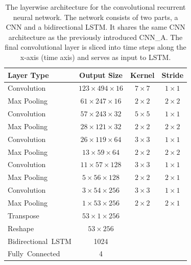     
  \begin{table}[]
  \centering
  \begin{tabularx}{\textwidth}{Xccc}
  \toprule
Layer Type                                          & Output Size    & Kernel & Stride  \\ \midrule
Convolution               & $123\times494\times16$  & $7\times7$    & $1\times1$    \\ 
Max Pooling               & $61\times247\times16$   & $2\times2$    & $2\times2$    \\ 
Convolution               & $57\times243\times32$   & $5\times5$    & $1\times1$    \\ 
Max Pooling               & $28\times121\times32$   & $2\times2$    & $2\times2$    \\ 
Convolution               & $26\times119\times64$   & $3\times3$    & $1\times1$    \\ 
Max Pooling               & $13\times59\times64$    & $2\times2$    & $2\times2$    \\ 
Convolution               & $11\times57\times128$   & $3\times3$    & $1\times1$    \\ 
Max Pooling               & $5\times56\times128$    & $2\times2$    & $2\times1$    \\ 
Convolution               & $3\times54\times256$    & $3\times3$    & $1\times1$    \\ 
Max Pooling               & $1\times53\times256$    & $2\times2$    & $2\times1$    \\ 
Transpose                 & $53\times1\times256$    &        &         \\
Reshape                   & $53\times256$           &        &         \\
\mbox{Bidirectional LSTM} & 1024                    &        &         \\
\mbox{Fully Connected}    & 4                       &        &         \\
  \bottomrule
  \end{tabularx}
  \caption{The layerwise architecture for the convolutional recurrent neural network. The network consists of two parts, a CNN and a bidirectional LSTM. It shares the same CNN architecture as the previously introduced CNN\_A. The final convolutional layer is sliced into time steps along the x-axis (time axis) and serves as input to LSTM.}
  \label{tab:layers_CRNN}
  \end{table}
  
  
